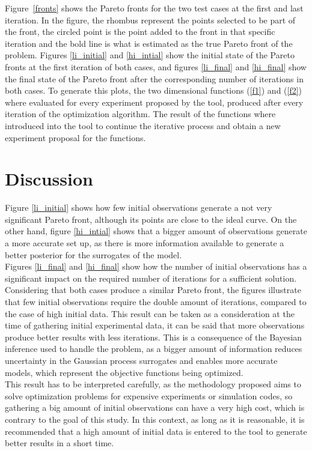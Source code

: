 \documentclass{article}
\begin{document}
Figure~\ref{fronts} shows the Pareto fronts for the two test cases at the first and last iteration. In the figure, the rhombus represent the points selected to be part of the front, the circled point is the point added to the front in that specific iteration and the bold line is what is estimated as the true Pareto front of the problem. Figures \ref{li_initial} and \ref{hi_intial} show the initial state of the Pareto fronts at the first iteration of both cases, and figures \ref{li_final} and \ref{hi_final} show the final state of the Pareto front after the corresponding number of iterations in both cases. To generate this plots, the two dimensional functions (\ref{f1}) and (\ref{f2}) where evaluated for every experiment proposed by the tool, produced after every iteration of the optimization algorithm. The result of the functions where introduced into the tool to continue the iterative process and obtain a new experiment proposal for the functions.

\section{Discussion}

Figure \ref{li_initial} shows how few initial observations generate a not very significant Pareto front, although its points are close to the ideal curve. On the other hand, figure \ref{hi_intial} shows that a bigger amount of observations generate a more accurate set up, as there is more information available to generate a better posterior for the surrogates of the model.\\

Figures \ref{li_final} and \ref{hi_final} show how the number of initial observations has a significant impact on the required number of iterations for a sufficient solution. Considering that both cases produce a similar Pareto front, the figures illustrate that few initial observations require the double amount of iterations, compared to the case of high initial data. This result can be taken as a consideration at the time of gathering initial experimental data, it can be said that more observations produce better results with less iterations. This is a consequence of the Bayesian inference used to handle the problem, as a bigger amount of information reduces uncertainty in the Gaussian process surrogates and enables more accurate models, which represent the objective functions being optimized.\\

This result has to be interpreted carefully, as the methodology proposed aims to solve optimization problems for expensive experiments or simulation codes, so gathering a big amount of initial observations can have a very high cost, which is contrary to the goal of this study. In this context, as long as it is reasonable, it is recommended that a high amount of initial data is entered to the tool to generate better results in a short time.
\end{document}

